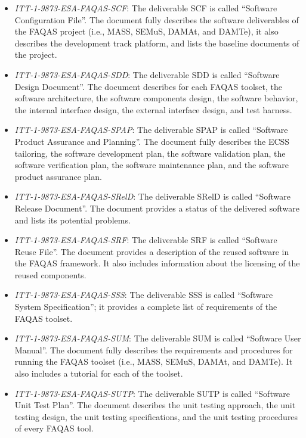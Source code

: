 \begin{itemize}
	\item \emph{ITT-1-9873-ESA-FAQAS-SCF}: The deliverable SCF is called ``Software Configuration File''. The document fully describes the software deliverables of the FAQAS project (i.e., MASS, SEMuS, DAMAt, and DAMTe), it also describes the development track platform, and lists the baseline documents of the project.

	\item \emph{ITT-1-9873-ESA-FAQAS-SDD}: The deliverable SDD is called ``Software Design Document''. The document describes for each FAQAS toolset, the software architecture, the software components design, the software behavior, the internal interface design, the external interface design, and test harness.

	\item \emph{ITT-1-9873-ESA-FAQAS-SPAP}: The deliverable SPAP is called ``Software Product Assurance and Planning''. The document fully describes the ECSS tailoring, the software development plan, the software validation plan, the software verification plan, the software maintenance plan, and the software product assurance plan.

	\item \emph{ITT-1-9873-ESA-FAQAS-SRelD}: The deliverable SRelD is called ``Software Release Document''. The document provides a status of the delivered software and lists its potential problems.

	\item \emph{ITT-1-9873-ESA-FAQAS-SRF}: The deliverable SRF is called ``Software Reuse File''. The document provides a description of the reused software in the FAQAS framework. It also includes information about the licensing of the reused components.

	\item \emph{ITT-1-9873-ESA-FAQAS-SSS}: The deliverable SSS is called ``Software System Specification''; it provides a complete list of requirements of the FAQAS toolset.

	\item \emph{ITT-1-9873-ESA-FAQAS-SUM}: The deliverable SUM is called ``Software User Manual''. The document fully describes the requirements and procedures for running the FAQAS toolset (i.e., MASS, SEMuS, DAMAt, and DAMTe). It also includes a tutorial for each of the toolset.

	\item \emph{ITT-1-9873-ESA-FAQAS-SUTP}: The deliverable SUTP is called ``Software Unit Test Plan''. The document describes the unit testing approach, the unit testing design, the unit testing specifications, and the unit testing procedures of every FAQAS tool.


\end{itemize}
